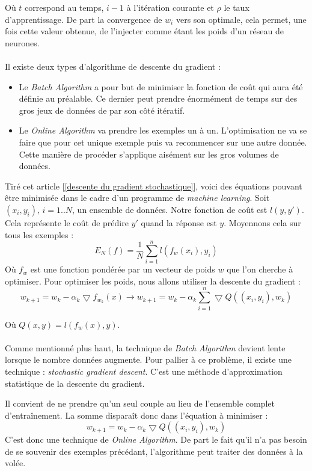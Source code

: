 \documentclass[a4paper, 11pt]{article}
\begin{document}
Où $t$ correspond au temps, $i-1$ à l'itération courante et $\rho$ le taux d'apprentissage.
De part la convergence de $w_i$ vers son optimale, cela permet, une fois cette valeur obtenue, de l'injecter comme étant les poids d'un réseau de neurones.

\paragraph{}
Il existe deux types d'algorithme de descente du gradient :
\begin{itemize}
\item Le \textit{Batch Algorithm} a pour but de minimiser la fonction de coût qui aura été définie au préalable. Ce dernier peut prendre énormément de temps sur des gros jeux de données de par son côté itératif.
\item Le \textit{Online Algorithm} va prendre les exemples un à un. L'optimisation ne va se faire que pour cet unique exemple puis va recommencer sur une autre donnée. Cette manière de procéder s'applique aisément sur les gros volumes de données.
\end{itemize}

Tiré cet article [\ref{descente du gradient stochastique}], voici des équations pouvant être minimisée dans le cadre d'un programme de \textit{machine learning}.
Soit $(x_i,y_i)\text{,\ } i=1..N$, un ensemble de données. Notre fonction de coût est $l(y,y')$. Cela représente le coût de prédire $y'$ quand la réponse est $y$. Moyennons cela sur tous les exemples :
$$E_N(f) = \frac{1}{N} \sum_{i=1}^{n}l(f_w(x_i),y_i)$$
Où $f_w$ est une fonction pondérée par un vecteur de poids $w$ que l'on cherche à optimiser.
Pour optimiser les poids, nous allons utiliser la descente du gradient :
$$w_{k+1} = w_k - \alpha_k \bigtriangledown f_{w_k}(x) \rightarrow w_{k+1} = w_k -\alpha_k \sum_{i=1}^n \bigtriangledown Q ((x_i,y_i), w_k)$$

Où $Q(x,y) = l(f_w(x),y)$.

\paragraph{}
Comme mentionné plus haut, la technique de \textit{Batch Algorithm} devient lente lorsque le nombre données augmente. Pour pallier à ce problème, il existe une technique : \textit{stochastic gradient descent}. C'est une méthode d'approximation statistique de la descente du gradient.

Il convient de ne prendre qu'un seul couple au lieu de l'ensemble complet d'entraînement. La somme disparaît donc dans l'équation à minimiser :
$$w_{k+1} = w_k -\alpha_k \bigtriangledown Q ((x_i,y_i), w_k)$$
C'est donc une technique de \textit{Online Algorithm}. De part le fait qu'il n'a pas besoin de se souvenir des exemples précédant, l'algorithme peut traiter des données à la volée.
\end{document}
